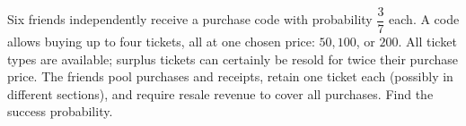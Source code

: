 Six friends independently receive a purchase code with probability $\dfrac{3}{7}$ each. A code allows buying up to four tickets, all at one chosen price: $ 50,100 $, or $ 200 $. All ticket types are available; surplus tickets can certainly be resold for twice their purchase price. The friends pool purchases and receipts, retain one ticket each (possibly in different sections), and require resale revenue to cover all purchases. Find the success probability.
